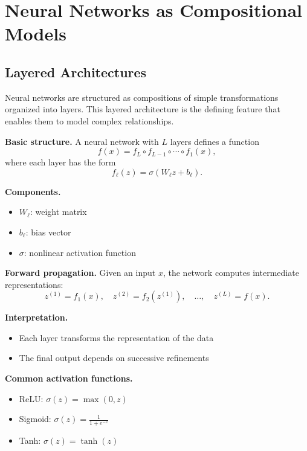 \chapter{Neural Networks as Compositional Models}

\section{Layered Architectures}

Neural networks are structured as compositions of simple transformations organized into layers. This layered architecture is the defining feature that enables them to model complex relationships.

\medskip

\noindent
\textbf{Basic structure.}  
A neural network with $L$ layers defines a function
\[
f(x) = f_L \circ f_{L-1} \circ \cdots \circ f_1(x),
\]
where each layer has the form
\[
f_\ell(z) = \sigma(W_\ell z + b_\ell).
\]

\medskip

\noindent
\textbf{Components.}
\begin{itemize}
    \item $W_\ell$: weight matrix
    \item $b_\ell$: bias vector
    \item $\sigma$: nonlinear activation function
\end{itemize}

\medskip

\noindent
\textbf{Forward propagation.}  
Given an input $x$, the network computes intermediate representations:
\[
z^{(1)} = f_1(x), \quad
z^{(2)} = f_2(z^{(1)}), \quad \dots, \quad
z^{(L)} = f(x).
\]

\medskip

\noindent
\textbf{Interpretation.}
\begin{itemize}
    \item Each layer transforms the representation of the data
    \item The final output depends on successive refinements
\end{itemize}

\medskip

\noindent
\textbf{Common activation functions.}
\begin{itemize}
    \item ReLU: $\sigma(z) = \max(0, z)$
    \item Sigmoid: $\sigma(z) = \frac{1}{1 + e^{-z}}$
    \item Tanh: $\sigma(z) = \tanh(z)$
\end{itemize}

